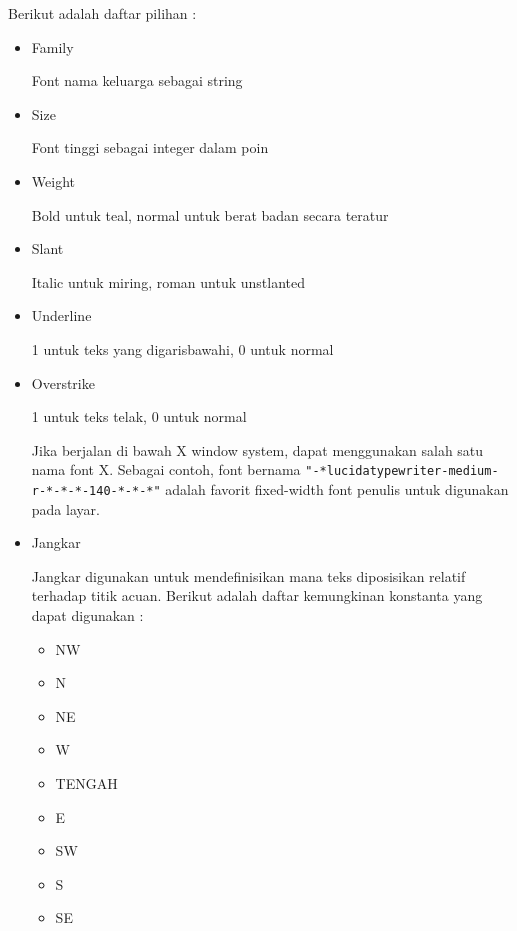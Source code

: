 \documentclass [12pt,a4paper,notitlepage,oneside,bahasa]{article}
\begin{document}
\vspace{12pt}
Berikut adalah daftar pilihan : 
 
\begin{itemize}

	\item Family \par
	Font nama keluarga sebagai string \par
	\noindent 
	\item Size \par
	Font tinggi sebagai integer dalam poin \par
	\noindent 
	\item Weight \par
	Bold untuk teal, normal untuk berat badan secara teratur \par
	\noindent 
	\item Slant \par
	Italic untuk miring, roman untuk unstlanted \par
	\noindent 
	\item Underline \par
	1 untuk teks yang digarisbawahi, 0 untuk normal \par
	\noindent 
	\item Overstrike \par
	1 untuk teks telak, 0 untuk normal \par
	Jika berjalan di bawah X window system, dapat menggunakan salah satu nama font X. Sebagai contoh, font bernama  \verb|"-*lucidatypewriter-medium-r-*-*-*-140-*-*-*"| adalah favorit fixed-width font penulis untuk digunakan pada layar. \par
	\noindent 
	\item Jangkar \par
	\noindent 
	Jangkar digunakan untuk mendefinisikan mana teks diposisikan relatif terhadap titik acuan. Berikut adalah daftar kemungkinan konstanta yang dapat digunakan :
	\noindent
	\begin{itemize}
		\item NW  
		\item N
		\item NE
		\item W
		\item TENGAH
		\item E
		\item SW
		\item S
		\item SE
	\end{itemize}
\end{itemize}
\end{document}
